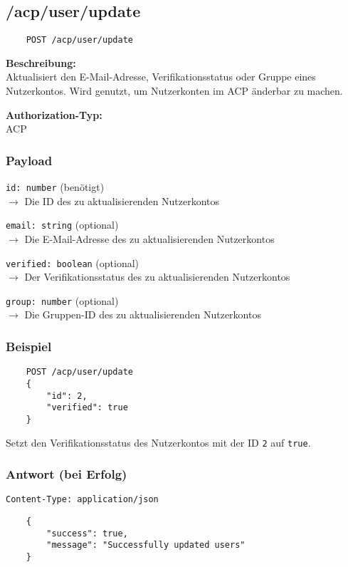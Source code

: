 \subsection{/acp/user/update}

\begin{lstlisting}
    POST /acp/user/update
\end{lstlisting}

\textbf{Beschreibung:} \\
Aktualisiert den E-Mail-Adresse, Verifikationsstatus oder Gruppe eines Nutzerkontos. Wird genutzt, um Nutzerkonten im ACP änderbar zu machen.

\textbf{Authorization-Typ:} \\
ACP

\subsubsection{Payload}

\lstinline{id: number} (benötigt) \\
$\rightarrow$ Die ID des zu aktualisierenden Nutzerkontos

\lstinline{email: string} (optional) \\
$\rightarrow$ Die E-Mail-Adresse des zu aktualisierenden Nutzerkontos

\lstinline{verified: boolean} (optional) \\
$\rightarrow$ Der Verifikationsstatus des zu aktualisierenden Nutzerkontos

\lstinline{group: number} (optional) \\
$\rightarrow$ Die Gruppen-ID des zu aktualisierenden Nutzerkontos

\subsubsection{Beispiel}

\begin{lstlisting}
    POST /acp/user/update
    {
        "id": 2,
        "verified": true
    }
\end{lstlisting}

Setzt den Verifikationsstatus des Nutzerkontos mit der ID \lstinline{2} auf \lstinline{true}.

\subsubsection{Antwort (bei Erfolg)}

\lstinline{Content-Type: application/json}
\begin{lstlisting}
    {
        "success": true, 
        "message": "Successfully updated users"
    }
\end{lstlisting}